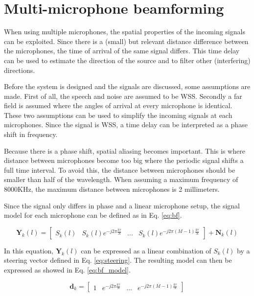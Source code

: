 \section{\quad Multi-microphone beamforming} \label{sec:mm_bf}
When using multiple microphones, the spatial properties of the incoming signals can be exploited. Since there is a (small) but relevant  distance difference between the microphones, the time of arrival of the same signal differs. This time delay can be used to estimate the direction of the source and to filter other (interfering) directions.

Before the system is designed and the signals are discussed, some assumptions are made. First of all, the speech and noise are assumed to be  WSS. Secondly a far field is assumed where the angles of arrival at every microphone is identical. These two assumptions can be used to simplify the incoming signals at each microphones. Since the signal is WSS, a time delay can be interpreted as a phase shift in frequency.

Because there is a phase shift, spatial aliasing becomes important. This is where distance between microphones become too big where the periodic signal shifts a full time interval. To avoid this, the distance between microphones should be smaller than half of the wavelength. When assuming a maximum frequency of 8000KHz, the maximum distance between microphones is 2 millimeters.

Since the signal only differs in phase and a linear microphone setup, the signal model for each microphone can be defined as in Eq. \ref{eq:bf}.

\begin{equation}
  \mathbf{Y}_{k}(l) =
  \begin{bmatrix}
    S_{k}(l) & S_{k}(l)e^{-j2\pi\frac{k\tau}{N}} & \hdots & S_{k}(l)e^{-j2\pi(M-1)\frac{k\tau}{N}}
  \end{bmatrix}
  + \mathbf{N}_{k}(l)
  \label{eq:bf}
\end{equation}

In this equation, $\mathbf{Y}_{k}(l)$ can be expressed as a linear combination of $S_{k}(l)$ by a steering vector defined in Eq. \ref{eq:steering}. The resulting model can then be expressed as showed in Eq. \ref{eq:bf_model}.

\begin{equation}
  \mathbf{d}_{k} =
  \begin{bmatrix}
    1 & e^{-j2\pi \frac{k\tau}{N}} & \hdots & e^{-j2\pi(M-1)\frac{k\tau}{N}}
  \end{bmatrix}
  \label{eq:steering}
\end{equation}

